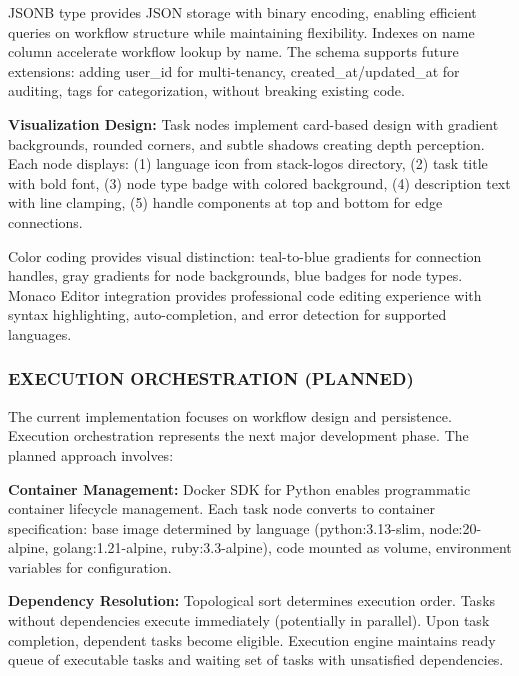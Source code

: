 \documentclass[12pt]{article}
\begin{document}
JSONB type provides JSON storage with binary encoding, enabling efficient queries on workflow structure while maintaining flexibility. Indexes on name column accelerate workflow lookup by name. The schema supports future extensions: adding user\_id for multi-tenancy, created\_at/updated\_at for auditing, tags for categorization, without breaking existing code.

\hspace{\parindent}\textbf{Visualization Design:} Task nodes implement card-based design with gradient backgrounds, rounded corners, and subtle shadows creating depth perception. Each node displays: (1) language icon from stack-logos directory, (2) task title with bold font, (3) node type badge with colored background, (4) description text with line clamping, (5) handle components at top and bottom for edge connections.

Color coding provides visual distinction: teal-to-blue gradients for connection handles, gray gradients for node backgrounds, blue badges for node types. Monaco Editor integration provides professional code editing experience with syntax highlighting, auto-completion, and error detection for supported languages.

\subsubsection{EXECUTION ORCHESTRATION (PLANNED)}

\hspace{\parindent}The current implementation focuses on workflow design and persistence. Execution orchestration represents the next major development phase. The planned approach involves:

\hspace{\parindent}\textbf{Container Management:} Docker SDK for Python enables programmatic container lifecycle management. Each task node converts to container specification: base image determined by language (python:3.13-slim, node:20-alpine, golang:1.21-alpine, ruby:3.3-alpine), code mounted as volume, environment variables for configuration.

\hspace{\parindent}\textbf{Dependency Resolution:} Topological sort determines execution order. Tasks without dependencies execute immediately (potentially in parallel). Upon task completion, dependent tasks become eligible. Execution engine maintains ready queue of executable tasks and waiting set of tasks with unsatisfied dependencies.
\end{document}
